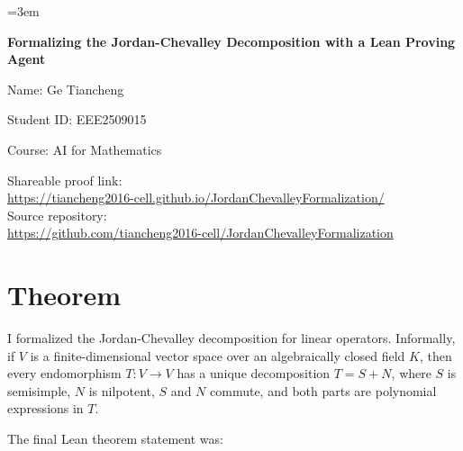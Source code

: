 \documentclass[12pt]{article}
\begin{document}
\frenchspacing
\justifying
\emergencystretch=3em

\begin{center}
{\bfseries\fontsize{14}{16}\selectfont Formalizing the Jordan-Chevalley Decomposition with a Lean Proving Agent\par}
\vspace{8pt}
{\fontsize{12}{14}\selectfont Name: Ge Tiancheng\par}
{\fontsize{12}{14}\selectfont Student ID: EEE2509015\par}
{\fontsize{12}{14}\selectfont Course: AI for Mathematics\par}
{\footnotesize Shareable proof link:\\
\href{https://tiancheng2016-cell.github.io/JordanChevalleyFormalization/}{https://tiancheng2016-cell.github.io/JordanChevalleyFormalization/}\\[6pt]
Source repository:\\
\href{https://github.com/tiancheng2016-cell/JordanChevalleyFormalization}{https://github.com/tiancheng2016-cell/JordanChevalleyFormalization}\par}
\end{center}

\vspace{8pt}

\section{Theorem}

I formalized the Jordan-Chevalley decomposition for linear operators. Informally, if \(V\) is a finite-dimensional vector space over an algebraically closed field \(K\), then every endomorphism \(T : V \to V\) has a unique decomposition \(T = S + N\), where \(S\) is semisimple, \(N\) is nilpotent, \(S\) and \(N\) commute, and both parts are polynomial expressions in \(T\).

The final Lean theorem statement was:
\end{document}

